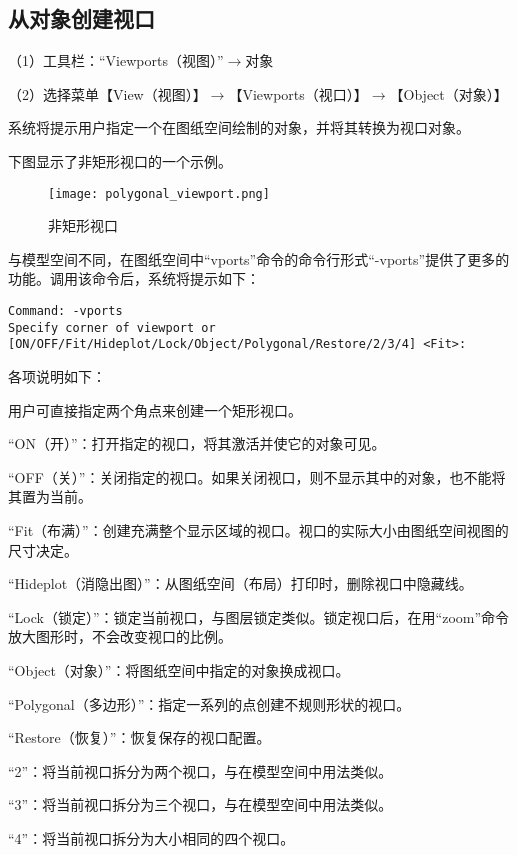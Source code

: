 \subsection{从对象创建视口}

（1）工具栏：“Viewports（视图）”$\to$对象

（2）选择菜单【View（视图）】$\to$【Viewports（视口）】$\to$【Object（对象）】

系统将提示用户指定一个在图纸空间绘制的对象，并将其转换为视口对象。

下图显示了非矩形视口的一个示例。

\begin{figure}[htbp]
\centering
\texttt{[image: polygonal\_viewport.png]}
\caption{非矩形视口}
\end{figure}

与模型空间不同，在图纸空间中“vports”命令的命令行形式“-vports”提供了更多的功能。调用该命令后，系统将提示如下：

\begin{verbatim}
Command: -vports
Specify corner of viewport or 
[ON/OFF/Fit/Hideplot/Lock/Object/Polygonal/Restore/2/3/4] <Fit>:
\end{verbatim}

各项说明如下： 

\begin{compactitem}
\item 用户可直接指定两个角点来创建一个矩形视口。
\item “ON（开）”：打开指定的视口，将其激活并使它的对象可见。
\item “OFF（关）”：关闭指定的视口。如果关闭视口，则不显示其中的对象，也不能将其置为当前。
\item “Fit（布满）”：创建充满整个显示区域的视口。视口的实际大小由图纸空间视图的尺寸决定。
\item “Hideplot（消隐出图）”：从图纸空间（布局）打印时，删除视口中隐藏线。
\item “Lock（锁定）”：锁定当前视口，与图层锁定类似。锁定视口后，在用“zoom”命令放大图形时，不会改变视口的比例。
\item “Object（对象）”：将图纸空间中指定的对象换成视口。
\item “Polygonal（多边形）”：指定一系列的点创建不规则形状的视口。
\item “Restore（恢复）”：恢复保存的视口配置。
\item “2”：将当前视口拆分为两个视口，与在模型空间中用法类似。
\item “3”：将当前视口拆分为三个视口，与在模型空间中用法类似。
\item “4”：将当前视口拆分为大小相同的四个视口。
\end{compactitem}


